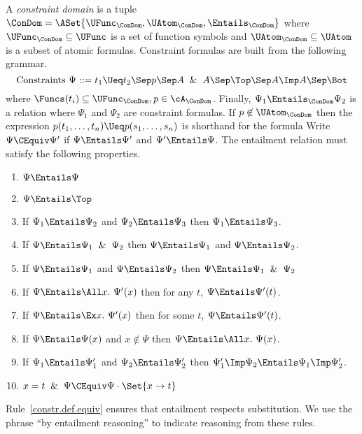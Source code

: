 \begin{definition}
  A \emph{constraint domain} is a tuple
  $\ConDom = \ASet{\UFunc_{\ConDom},\UAtom_{\ConDom},\Entails_{\ConDom}}$
  where $\UFunc_{\ConDom}\subseteq\UFunc$ is a set of function symbols and
  $\UAtom_{\ConDom}\subseteq\UAtom$ is a subset of atomic formulas.
  Constraint formulas are built from the following grammar.
  \[
  \mbox{Constraints } \Psi ::= t_1\Ueq t_2 \Sep p \Sep A \And A \Sep \Top \Sep A \Imp A \Sep \Bot
  \]
  where $\Funcs(t_i)\subseteq\UFunc_{\ConDom}, p\in\cA_\ConDom$.
  Finally, $\Psi_1\Entails_{\ConDom}\Psi_2$ is a relation where
  $\Psi_1$ and $\Psi_2$ are constraint formulas.  If $p\not\in\UAtom_{\ConDom}$ then
  the expression
  $p(t_1,\ldots,t_n)\Ueq p(s_1,\ldots,s_n)$ is shorthand for the formula
  Write $\Psi\CEquiv\Psi'$ if $\Psi\Entails\Psi'$ and $\Psi'\Entails\Psi$.
  The entailment relation must satisfy the following properties.
  \begin{enumerate}
  \item
    $\Psi\Entails\Psi$
  \item
    $\Psi\Entails\Top$
  \item
    If $\Psi_1\Entails\Psi_2$ and $\Psi_2\Entails\Psi_3$ then
    $\Psi_1\Entails\Psi_3$.
  \item
    If $\Psi\Entails \Psi_1\And\Psi_2$ then $\Psi\Entails \Psi_1$ and $\Psi\Entails \Psi_2$.
  \item
    If $\Psi\Entails \Psi_1$ and $\Psi\Entails\Psi_2$ then
    $\Psi\Entails \Psi_1\And\Psi_2$
  \item
    If $\Psi\Entails \All x.~\Psi'(x)$ then for any $t$, $\Psi\Entails\Psi'(t)$.
  \item
    If $\Psi\Entails \Ex x.~\Psi'(x)$ then for some $t$, $\Psi\Entails\Psi'(t)$.
  \item
    If $\Psi\Entails \Psi(x)$ and $x\not\in\Psi$ then $\Psi\Entails\All x.~\Psi(x)$.
  \item
    If $\Psi_1\Entails \Psi_1'$ and $\Psi_2\Entails \Psi_2'$
    then $\Psi_1'\Imp\Psi_2\Entails \Psi_1\Imp\Psi_2'$.
  \item\label{constr.def.equiv} $x = t\And \Psi \CEquiv \Psi\cdot\Set{x\to t}$
  \end{enumerate}

  \noindent
  Rule~\ref{constr.def.equiv} ensures that entailment respects substitution.
  We use the phrase ``by entailment reasoning'' to indicate reasoning from these
  rules.
\end{definition}


